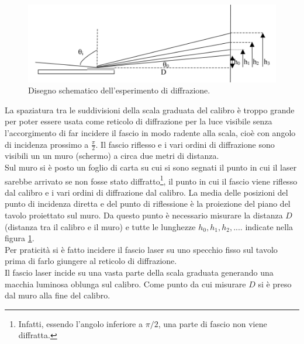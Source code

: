 \documentclass[10pt,a4paper]{article}
\begin{document}
\begin{figure}[!htb]
  \centering
  \includegraphics[scale=.5]{disegno1.png}
\caption{Disegno schematico dell'esperimento di diffrazione.}
\label{parteAfigura}

\end{figure}
La spaziatura tra le suddivisioni della scala graduata del calibro è troppo grande per poter essere usata come reticolo di diffrazione per la luce visibile senza l'accorgimento di far incidere il fascio in modo radente alla scala, cioè con angolo di incidenza prossimo a $\frac{\pi}{2}$. Il fascio riflesso e i vari ordini di diffrazione sono visibili un un muro (schermo) a circa due metri di distanza.\\
Sul muro si è posto un foglio di carta su cui si sono segnati il punto in cui il laser sarebbe arrivato se non fosse stato diffratto\footnote{Infatti, essendo l'angolo inferiore a $\pi /2$, una parte di fascio non viene diffratta.}, il punto in cui il fascio viene riflesso dal calibro e i vari ordini di diffrazione dal calibro. La media delle posizioni del punto di incidenza diretta e del punto di riflessione è la proiezione del piano del tavolo proiettato sul muro. Da questo punto è necessario misurare la distanza $D$ (distanza tra il calibro e il muro) e tutte le lunghezze $h_0, h_1, h_2,...$. indicate nella figura \ref{parteAfigura}.\\
Per praticità si è fatto incidere il fascio laser su uno specchio fisso sul tavolo prima di farlo giungere al reticolo di diffrazione.\\ 
Il fascio laser incide su una vasta parte della scala graduata generando una macchia luminosa oblunga sul calibro. Come punto da cui misurare $D$ si è preso dal muro alla fine del calibro.\\

\end{document}
